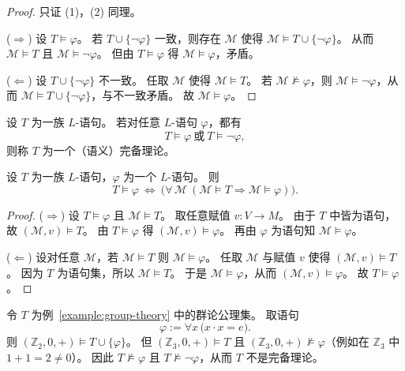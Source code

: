 \documentclass[lang=cn,a4paper,newtx,section]{elegantbook}
\begin{document}
 \begin{proof}
 只证 (1)，(2) 同理。

 ($\Rightarrow$) 设 $T\models\varphi$。
 若 $T\cup\{\neg\varphi\}$ 一致，则存在 $\mathcal M$ 使得 $\mathcal M\models T\cup\{\neg\varphi\}$。
 从而 $\mathcal M\models T$ 且 $\mathcal M\models\neg\varphi$。
 但由 $T\models\varphi$ 得 $\mathcal M\models\varphi$，矛盾。

 ($\Leftarrow$) 设 $T\cup\{\neg\varphi\}$ 不一致。
 任取 $\mathcal M$ 使得 $\mathcal M\models T$。
 若 $\mathcal M\not\models\varphi$，则 $\mathcal M\models\neg\varphi$，从而 $\mathcal M\models T\cup\{\neg\varphi\}$，与不一致矛盾。
 故 $\mathcal M\models\varphi$。
 \end{proof}

 \begin{definition}[完备理论]
 \label{complete-theory}
 设 $T$ 为一族 $L$-语句。
 若对任意 $L$-语句 $\varphi$，都有
 \[
   T\models\varphi\ \text{或}\ T\models\neg\varphi,
 \]
 则称 $T$ 为一个（语义）完备理论。
 \end{definition}

 \begin{proposition}
 \label{entailment-via-models}
 设 $T$ 为一族 $L$-语句，$\varphi$ 为一个 $L$-语句。
 则
 \[
   T\models\varphi\ \Longleftrightarrow\ \bigl(\forall\,\mathcal M\ (\mathcal M\models T\Rightarrow\mathcal M\models\varphi)\bigr).
 \]
 \end{proposition}

 \begin{proof}
 ($\Rightarrow$) 设 $T\models\varphi$ 且 $\mathcal M\models T$。
 取任意赋值 $v:V\to M$。
 由于 $T$ 中皆为语句，故 $(\mathcal M,v)\models T$。
 由 $T\models\varphi$ 得 $(\mathcal M,v)\models\varphi$。
 再由 $\varphi$ 为语句知 $\mathcal M\models\varphi$。

 ($\Leftarrow$) 设对任意 $\mathcal M$，若 $\mathcal M\models T$ 则 $\mathcal M\models\varphi$。
 任取 $\mathcal M$ 与赋值 $v$ 使得 $(\mathcal M,v)\models T$。
 因为 $T$ 为语句集，所以 $\mathcal M\models T$。
 于是 $\mathcal M\models\varphi$，从而 $(\mathcal M,v)\models\varphi$。
 故 $T\models\varphi$。
 \end{proof}

 \begin{example}[群论理论不完备]
 令 $T$ 为例~\ref{example:group-theory} 中的群论公理集。
 取语句
 \[
   \varphi:=\forall x\,\bigl(x\cdot x=e\bigr).
 \]
 则 $(\mathbb Z_2,0,+)\models T\cup\{\varphi\}$。
 但 $(\mathbb Z_3,0,+)\models T$ 且 $(\mathbb Z_3,0,+)\not\models\varphi$（例如在 $\mathbb Z_3$ 中 $1+1=2\neq 0$）。
 因此 $T\not\models\varphi$ 且 $T\not\models\neg\varphi$，从而 $T$ 不是完备理论。
 \end{example}
\end{document}
